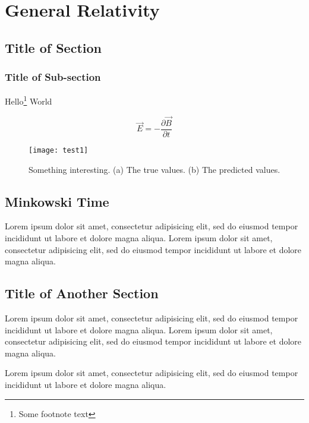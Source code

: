 \chapter{General Relativity}

\localtoc

\section{Title of Section}
\subsection{Title of Sub-section}

\lipsum[1]
Hello\footnote{Some footnote text} World
\lipsum[3-6]

\begin{equation}
\vec{E}=-\frac{\partial \vec{B}}{\partial t}
\end{equation}

\begin{figure}[tb]
  \centering
  \texttt{[image: test1]}
  \caption{Something interesting. (a) The true values. (b) The predicted values.}
\end{figure}

\section{Minkowski Time}
\lipsum[22-23]
\lipsum[11-13]
\begin{aside}
  Lorem ipsum dolor sit amet, consectetur adipisicing elit, sed do eiusmod tempor incididunt ut labore et dolore magna aliqua. Lorem ipsum dolor sit amet, consectetur adipisicing elit, sed do eiusmod tempor incididunt ut labore et dolore magna aliqua.
\end{aside}

\section{Title of Another Section}
\lipsum[1]
\begin{aside}[Remark:]
  Lorem ipsum dolor sit amet, consectetur adipisicing elit, sed do eiusmod tempor incididunt ut labore et dolore magna aliqua. Lorem ipsum dolor sit amet, consectetur adipisicing elit, sed do eiusmod tempor incididunt ut labore et dolore magna aliqua.
\end{aside}

\lipsum[35]
\begin{textbox}
  Lorem ipsum dolor sit amet, consectetur adipisicing elit, sed do eiusmod tempor incididunt ut labore et dolore magna aliqua.
\end{textbox}

